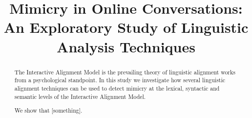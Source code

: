 \documentclass[conference]{IEEEtran}
\begin{document}
\title{Mimicry in Online Conversations: An Exploratory Study of Linguistic Analysis Techniques}


\author{
}


% 








\maketitle

\begin{abstract}
The Interactive Alignment Model is the prevailing theory of linguistic alignment works from a psychological standpoint.
In this study we investigate how several linguistic alignment techniques can be used to detect mimicry at the lexical, syntactic and semantic levels of the Interactive Alignment Model.

We show that [something].
\end{abstract}
\end{document}
